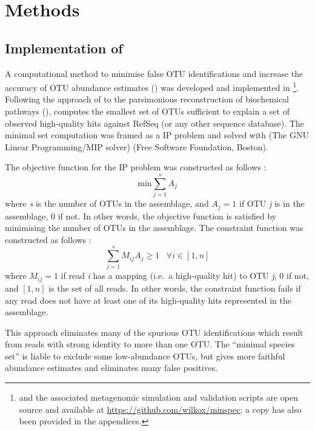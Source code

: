 \section{Methods}

\subsection{Implementation of }

A computational method to minimise false \ac{OTU} identifications and increase the accuracy of \ac{OTU} abundance estimates () was developed and implemented in \footnote{ and the associated metagenomic simulation and validation scripts are open source and available at \url{https://github.com/wilkox/minspec}; a copy has also been provided in the appendices.}.
Following the approach of \citet{Ye:2009bl} to the parsimonious reconstruction of biochemical pathways (),  computes the smallest set of \acp{OTU} sufficient to explain a set of observed high-quality hits against RefSeq (or any other sequence database).
The minimal set computation was framed as a \ac{IP} problem and solved with  (The GNU Linear Programming/MIP solver) (Free Software Foundation, Boston).

The objective function for the \ac{IP} problem was constructed as follows \citep[adapted from][]{Ye:2009bl}:
\begin{equation*}
\mathrm{min}\sum_{j=1}^{s}A_{j}
\end{equation*}
where \textit{s} is the number of \acp{OTU} in the assemblage, and $A_{j} = 1$ if \ac{OTU} \textit{j} is in the assemblage, 0 if not.
In other words, the objective function is satisfied by minimising the number of \acp{OTU} in the assemblage.
The constraint function was constructed as follows \citep[adapted from][]{Ye:2009bl}:
\begin{equation*}
\sum_{j=1}^{s}M_{ij}A_{j}\ge1 \; \; \; \forall i \in [1,n]
\end{equation*}
where $M_{ij} = 1$ if read \textit{i} has a mapping (i.e.\ a high-quality  hit) to \ac{OTU} \textit{j}, 0 if not, and $[1,n]$ is the set of all reads.
In other words, the constraint function fails if any read does not have at least one of its high-quality  hits represented in the assemblage.

This approach eliminates many of the spurious \ac{OTU} identifications which result from reads with strong identity to more than one \ac{OTU}.
The ``minimal species set'' is liable to exclude some low-abundance \acp{OTU}, but gives more faithful abundance estimates and eliminates many false positives.

